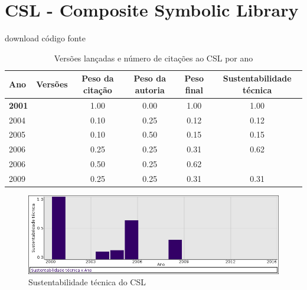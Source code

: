 \section{CSL - Composite Symbolic Library}
\checkmark download
\checkmark código fonte


\begin{table}[H]
\caption{Versões lançadas e número de citações ao CSL por ano}
\centering
\begin{tabular}{| l | c | c | c | c | c |}
  \hline
  Ano & Versões & Peso da citação & Peso da autoria & Peso final & Sustentabilidade técnica \\
  \hline
            {\bf 2001}
          &
          
          &
          1.00
          &
          0.00
          &
          1.00
          &
            {\color{blue} 1.00}
          \\
\hline
            2004
          &
          
          &
          0.10
          &
          0.25
          &
          0.12
          &
            {\color{red} 0.12}
          \\
\hline
            2005
          &
          
          &
          0.10
          &
          0.50
          &
          0.15
          &
            {\color{red} 0.15}
          \\
\hline
            2006
          &
          
          &
          0.25
          &
          0.25
          &
          0.31
          &
            {\color{blue} 0.62}
          \\
            2006
          &
          
          &
          0.50
          &
          0.25
          &
          0.62
          &
          \\
\hline
            2009
          &
          
          &
          0.25
          &
          0.25
          &
          0.31
          &
            {\color{red} 0.31}
          \\
\hline
\end{tabular}
\end{table}

\begin{figure}[h]
  \center
  \includegraphics[scale=0.50]{imagens/softwares-charts/composite.png}
  \caption{Sustentabilidade técnica do CSL}
\end{figure}


